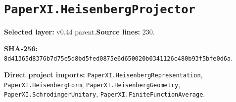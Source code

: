 \documentclass[10pt,oneside]{book}
\begin{document}
\section{\texorpdfstring{\nolinkurl{PaperXI.HeisenbergProjector}}{PaperXI.HeisenbergProjector}}\label{module:PaperXI.HeisenbergProjector}

\textbf{Selected layer:} v0.44 parent.\quad\textbf{Source lines:} 230.\par\textbf{SHA-256:} {\scriptsize\nolinkurl{8d41365d8376b7d75e5d8bd5fed0875e6d650020b0341126c480b93f5bfe0d6a}}.


\textbf{Direct project imports:} \nolinkurl{PaperXI.HeisenbergRepresentation}, \nolinkurl{PaperXI.HeisenbergForm}, \nolinkurl{PaperXI.HeisenbergGeometry}, \nolinkurl{PaperXI.SchrodingerUnitary}, \nolinkurl{PaperXI.FiniteFunctionAverage}.
\end{document}
